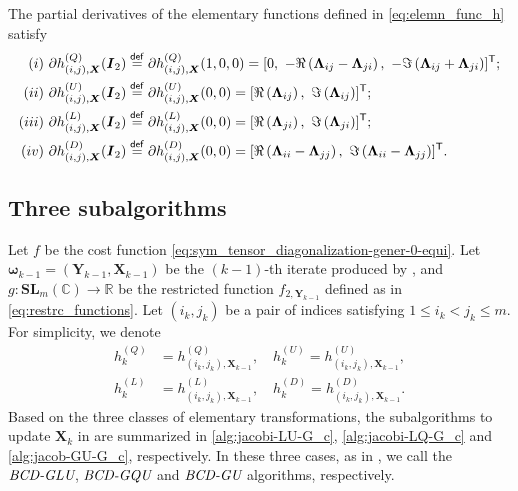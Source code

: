 \documentclass[final,onefignum,onetabnum]{siamart190516}
\newcommand{\matr}[1]{\boldsymbol{#1}}
\newcommand{\T}{{\sf T}} %
\newcommand{\eqdef}{\stackrel{\sf def}{=}}
\newcommand{\RR}{\mathbb{R}}
\newcommand{\CC}{\mathbb{C}}
\newcommand{\hij}[3]{h^{(Q)}_{(#1,#2), #3}}
\newcommand{\SL}{\mathbf{SL}}
\begin{document}
\begin{lemma}\label{lem:ProjGradSubmatrix_2}
The partial derivatives of the elementary functions defined in \cref{eq:elemn_func_h} satisfy
\begin{align*}
(i)\ &\partial\hij{i}{j}{\matr{X}}(\matr{I}_2) \eqdef \partial\hij{i}{j}{\matr{X}}(1,0,0)
= [0,\ -\Re\left(\matr{\Lambda}_{ij} - \matr{\Lambda}_{ji}\right), \ -\Im\left(\matr{\Lambda}_{ij} + \matr{\Lambda}_{ji}\right)]^{\T};\\
(ii)\  &\partial h^{(U)}_{(i,j),\matr{X}}(\matr{I}_2) \eqdef \partial h^{(U)}_{(i,j),\matr{X}}(0,0)
= [\Re \left(\matr{\Lambda}_{ij}\right), \  \Im \left(\matr{\Lambda}_{ij}\right)]^{\T};\\
(iii)\  &\partial h^{(L)}_{(i,j),\matr{X}}(\matr{I}_2) \eqdef
\partial h^{(L)}_{(i,j),\matr{X}}(0,0)
= [\Re \left(\matr{\Lambda}_{ji}\right),  \ \Im \left(\matr{\Lambda}_{ji}\right)]^{\T};\\
(iv)\  &\partial h^{(D)}_{(i,j),\matr{X}}(\matr{I}_2) \eqdef
\partial h^{(D)}_{(i,j),\matr{X}}(0,0)
= [\Re \left(\matr{\Lambda}_{ii} -  \matr{\Lambda}_{jj}\right),  \ \Im \left(\matr{\Lambda}_{ii} -  \matr{\Lambda}_{jj}\right)]^{\T}.
\end{align*}
\end{lemma}


\subsection{Three subalgorithms}\label{subsec:Jaco_G}
Let $f$ be the cost function \cref{eq:sym_tensor_diagonalization-gener-0-equi}. 
Let $\matr{\omega}_{k-1}=(\matr{Y}_{k-1},\matr{X}_{k-1})$ be the $(k-1)$-th iterate produced by , and 
$g: \SL_{m}(\CC)\rightarrow\RR$ be the restricted function $f_{2,\matr{Y}_{k-1}}$ defined as in \cref{eq:restrc_functions}. 
Let $(i_k,j_k)$ be a pair of indices satisfying $1 \le i_k < j_k \le m$. 
For simplicity, we denote 
\begin{equation}\label{eq:restr_functions}
\begin{aligned}
h^{(Q)}_k &= h^{(Q)}_{(i_k,j_k),\matr{X}_{k-1}}, \quad h^{(U)}_k = h^{(U)}_{(i_k,j_k),\matr{X}_{k-1}},  \\
h^{(L)}_k &= h^{(L)}_{(i_k,j_k),\matr{X}_{k-1}}, \quad h^{(D)}_k = h^{(D)}_{(i_k,j_k),\matr{X}_{k-1}}.
\end{aligned}
\end{equation} 
Based on the three classes of elementary transformations, the subalgorithms to update $\matr{X}_k$ in  are summarized in \autoref{alg:jacobi-LU-G_c},  \autoref{alg:jacobi-LQ-G_c} and \autoref{alg:jacob-GU-G_c}, respectively. 
In these three cases, as in , 
we call  the $\emph{BCD-GLU}$, $\emph{BCD-GQU}$ and $\emph{BCD-GU}$ algorithms, respectively. 
\end{document}
